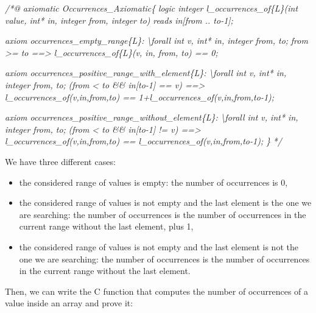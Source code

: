 \documentclass[12pt,francais,]{scrbook}
\newenvironment{Shaded}{}{}
\newcommand{\CommentTok}[1]{\textcolor[rgb]{0.38,0.63,0.69}{\textit{{#1}}}}
\providecommand{\tightlist}{%
  \setlength{\itemsep}{0pt}\setlength{\parskip}{0pt}}
\begin{document}
\begin{footnotesize}\begin{Shaded}
\begin{Highlighting}[]
\CommentTok{/*@}
\CommentTok{  axiomatic Occurrences_Axiomatic\{}
\CommentTok{    logic integer l_occurrences_of\{L\}(int value, int* in, integer from, integer to)}
\CommentTok{      reads in[from .. to-1];}

\CommentTok{    axiom occurrences_empty_range\{L\}:}
\CommentTok{      \textbackslash{}forall int v, int* in, integer from, to;}
\CommentTok{        from >= to ==> l_occurrences_of\{L\}(v, in, from, to) == 0;}

\CommentTok{    axiom occurrences_positive_range_with_element\{L\}:}
\CommentTok{      \textbackslash{}forall int v, int* in, integer from, to;}
\CommentTok{        (from < to && in[to-1] == v) ==>}
\CommentTok{      l_occurrences_of(v,in,from,to) == 1+l_occurrences_of(v,in,from,to-1);}

\CommentTok{    axiom occurrences_positive_range_without_element\{L\}:}
\CommentTok{      \textbackslash{}forall int v, int* in, integer from, to;}
\CommentTok{        (from < to && in[to-1] != v) ==>}
\CommentTok{      l_occurrences_of(v,in,from,to) == l_occurrences_of(v,in,from,to-1);}
\CommentTok{  \}}
\CommentTok{*/}
\end{Highlighting}
\end{Shaded}\end{footnotesize}

We have three different cases:

\begin{itemize}
\tightlist
\item
  the considered range of values is empty: the number of occurrences is
  0,
\item
  the considered range of values is not empty and the last element is
  the one we are searching: the number of occurrences is the number of
  occurrences in the current range without the last element, plus 1,
\item
  the considered range of values is not empty and the last element is
  not the one we are searching: the number of occurrences is the number
  of occurrences in the current range without the last element.
\end{itemize}

Then, we can write the C function that computes the number of
occurrences of a value inside an array and prove it:
\end{document}
